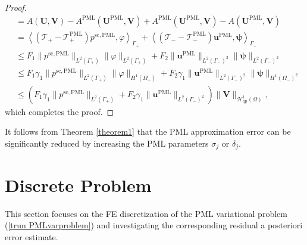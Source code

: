 \documentclass[final,3p,times]{elsarticle}
\begin{document}
\begin{proof}
\begin{align*}
		&=A\left(\boldsymbol{U},\boldsymbol{V}\right) 
		- A^{\mathrm{PML}}\left(\boldsymbol{U}^{\mathrm{PML}}, \boldsymbol{V}\right) 
		+ A^{\mathrm{PML}}\left(\boldsymbol{U}^{\mathrm{PML}}, \boldsymbol{V}\right) -A\left(\boldsymbol{U}^{\mathrm{PML}}, \boldsymbol{V}\right)\\
		&=\left\langle\left(\mathscr{T}_+-\mathscr{T}_+^{\mathrm{PML}}\right) p^{\mathrm{sc},\mathrm{PML}}, \varphi\right\rangle_{\Gamma_+}+
		\left\langle\left(\mathscr{T}_--\mathscr{T}_-^{\mathrm{PML}}\right) \boldsymbol{u}^{\mathrm{PML}}, \boldsymbol{\psi}\right\rangle_{\Gamma_-}\\
		&\leq F_1\|p^{\mathrm{sc},\mathrm{PML}}\|_{L^2(\Gamma_+)}\|\varphi\|_{L^2(\Gamma_+)}+ F_2\|\boldsymbol{u}^{\mathrm{PML}}\|_{L^2(\Gamma_-)^2}\|\boldsymbol{\psi}\|_{L^2(\Gamma_-)^2}\\
		&\leq F_1 \gamma_1 \|p^{\mathrm{sc},\mathrm{PML}}\|_{L^2(\Gamma_+)}\|\varphi\|_{H^1(\Omega_+)} + F_2 \gamma_1 \|\boldsymbol{u}^{\mathrm{PML}}\|_{L^2(\Gamma_-)^2}\|\boldsymbol{\psi}\|_{H^1(\Omega_-)^2}\\
		&\leq (F_1 \gamma_1 \|p^{\mathrm{sc},\mathrm{PML}}\|_{L^2(\Gamma_+)} + F_2 \gamma_1 \|\boldsymbol{u}^{\mathrm{PML}}\|_{L^2(\Gamma_-)^2})\|\boldsymbol{V}\|_{\mathscr{H}^1_\mathrm{qp}(\Omega)},
	\end{align*}
	which completes the proof.
\end{proof}
It follows from Theorem \ref{theorem1} that the PML approximation error can be significantly reduced by increasing the PML parameters $\sigma_j$ or $\delta_j$.

\section{Discrete Problem} \label{SECTION4}
This section focuses on the FE discretization of the PML variational problem (\ref{trun PMLvarproblem}) and investigating the corresponding residual a posteriori error estimate.
\end{document}
